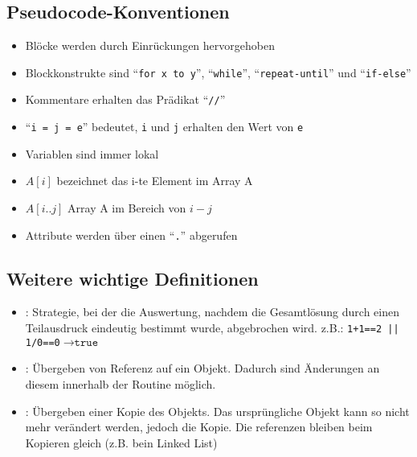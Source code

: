 \documentclass[
    12pt,
    a4paper,
    ngerman,
    color=3b,%
    marginpar=false,
    colorback=false,
    leqno,
]{tudaexercise}
\begin{document}
\subsection{Pseudocode-Konventionen}
\begin{itemize}
    \item Blöcke werden durch Einrückungen hervorgehoben
    \item Blockkonstrukte sind "`\texttt{for x to y}"', "`\texttt{while}"', "`\texttt{repeat-until}"' und "`\texttt{if-else}"'
    \item Kommentare erhalten das Prädikat "`\texttt{//}"'
    \item "`\texttt{i = j = e}"' bedeutet, \texttt{i} und \texttt{j} erhalten den Wert von \texttt{e}
    \item Variablen sind immer lokal
    \item $A[i]$ bezeichnet das i-te Element im Array A
    \item $A[i..j]$ Array A im Bereich von $i-j$
    \item Attribute werden über einen "`\texttt{.}"' abgerufen
\end{itemize}
\subsection{Weitere wichtige Definitionen}
\begin{itemize}
    \item {}: Strategie, bei der die Auswertung, nachdem die Gesamtlösung durch einen Teilausdruck eindeutig bestimmt wurde, abgebrochen wird. 
    z.B.: \texttt{1+1==2 || 1/0==0}$\longrightarrow \texttt{true}$
    \item {}: Übergeben von Referenz auf ein Objekt. Dadurch sind Änderungen an diesem innerhalb der Routine möglich.
    \item {}: Übergeben einer Kopie des Objekts. Das ursprüngliche Objekt kann so nicht mehr verändert werden, jedoch die Kopie. Die referenzen bleiben beim Kopieren gleich (z.B. bein Linked List)
\end{itemize}
\clearpage
\end{document}
